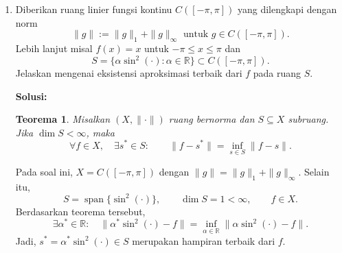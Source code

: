 \documentclass[12pt]{article}
\newtheorem{theorem}{Teorema}
\begin{document}
\begin{enumerate}
\begin{enumerate}
\begin{itemize}
\begin{align*}
                                                 & = \frac{\xi^3}{6} + \frac{1}{3} - \frac{\xi}{2} + \frac{\xi^3}{6}                                                                                  \\
                                                 & = \frac{\xi^3}{3} - \frac{\xi}{2} + \frac{1}{3}
                                    \end{align*}
                        \end{itemize}
                        Untuk mendapatkan nilai minimum untuk kasus terakhir, kita hitung turunan dan cari akar persamaannya:
                        $$ I'(\xi) = \xi^2 - \frac{1}{2} = 0 \implies \xi = \pm \frac{1}{\sqrt{2}} $$
                        Diketahui karena rentangnya adalah $0 < \xi < 1$, nilai titik kritis stasionernya hanyalah $\xi = \frac{1}{\sqrt{2}} = \frac{\sqrt{2}}{2}$.
                        Saat $\xi = \frac{1}{\sqrt{2}}$, $I(\frac{1}{\sqrt{2}}) = \frac{1}{6\sqrt{2}} - \frac{1}{2\sqrt{2}} + \frac{1}{3} = \frac{1}{3} - \frac{\sqrt{2}}{6} \approx 0.0976$.
                        Karena nilai minimum ini jauh lebih kecil dari nilai minimum kedua domain fungsi lainnya, ini adalah minimum global. (Selain itu $I''(\xi) = 2\xi > 0$ mengkonfirmasi titik ekstrem ini adalah minimum).
                        Sehingga aproksimasi terbaik dengan norma-1 adalah $g_{\xi^*}(x) = \frac{\sqrt{2}}{2}x$.
            \end{enumerate}

      \item Diberikan ruang linier fungsi kontinu $C([-\pi, \pi])$ yang dilengkapi dengan norm
            $$ \|g\| := \|g\|_1 + \|g\|_\infty \text{ untuk } g \in C([-\pi, \pi]). $$
            Lebih lanjut misal $f(x) = x$ untuk $-\pi \le x \le \pi$ dan
            $$ S = \{ \alpha \sin^2(\cdot) : \alpha \in \mathbb{R} \} \subset C([-\pi, \pi]). $$
            Jelaskan mengenai eksistensi aproksimasi terbaik dari $f$ pada ruang $S$.

            \textbf{Solusi:}
            \begin{theorem}
                  Misalkan $(X,\|\cdot\|)$ ruang bernorma dan $S\subseteq X$ subruang.
                  Jika $\dim S<\infty$, maka
                  \[
                        \forall f\in X,\quad \exists s^*\in S:
                        \qquad \|f-s^*\|=\inf_{s\in S}\|f-s\|.
                  \]
            \end{theorem}

            Pada soal ini, $X=C([-\pi,\pi])$ dengan $\|g\|=\|g\|_1+\|g\|_\infty$.
            Selain itu,
            \[
                  S=\operatorname{span}\{\sin^2(\cdot)\},\qquad
                  \dim S=1<\infty,\qquad f\in X.
            \]
            Berdasarkan teorema tersebut,
            \[
                  \exists\alpha^*\in\mathbb{R}:\quad
                  \|\alpha^*\sin^2(\cdot)-f\|
                  =\inf_{\alpha\in\mathbb{R}}\|\alpha\sin^2(\cdot)-f\|.
            \]
            Jadi, $s^*=\alpha^*\sin^2(\cdot)\in S$ merupakan hampiran terbaik dari $f$.


\end{enumerate}
\end{document}
